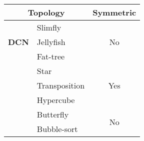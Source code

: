   \small
  \begin{table}[h!]
    \begin{tabular}{|c| l |c|}
      \toprule
      \multicolumn{2}{|c|}{\multirow{1}{*}{\textbf{Topology}}}&\multirow{1}{*}{\textbf{Symmetric}}\\
      \midrule
      \multirow{3}{*}{\textbf{DCN}}&Slimfly & \multirow{3}{*}{No}\\
      &Jellyfish & \\
      &Fat-tree &\\
      \hline
      \multirow{2}{*}{\textbf{}}&Star &\multirow{3}{*}{Yes}\\
      \multirow{3}{*}{\textbf{CG}}&Transposition & \\
      &Hypercube& \\
      \cline{2-3}
      \multirow{1}{*}{\textbf{}}&Butterfly&\multirow{2}{*}{No}\\
      \multirow{1}{*}{\textbf{}}&Bubble-sort& \\
      \bottomrule
    \end{tabular}
  \end{table}